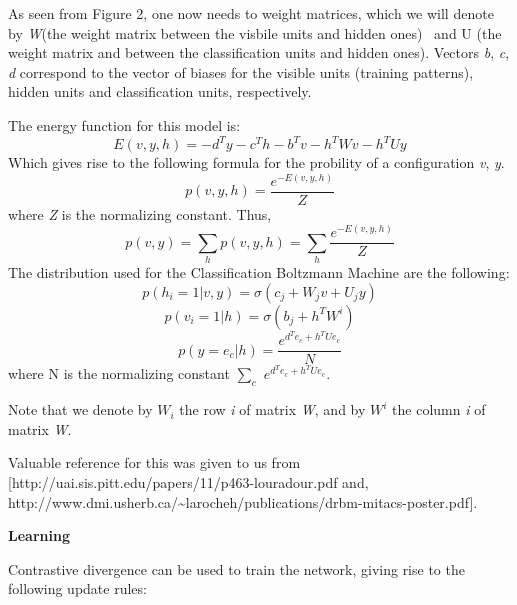 \documentclass{letter}
\newcommand{\nocomma}{}
\newcommand{\noplus}{}
\newcommand{\tmtextbf}[1]{{\bfseries{#1}}}
\newcommand{\tmtextit}[1]{{\itshape{#1}}}
\begin{document}
As seen from Figure 2, one now needs to weight matrices, which we will denote
by \tmtextit{W}(the weight matrix between the visbile units and hidden ones) \
and U (the weight matrix and between the classification units and hidden
ones). Vectors \tmtextit{b}, \tmtextit{c}, \tmtextit{d} correspond to the
vector of biases for the visible units (training patterns), hidden units and
classification units, respectively.

The energy function for this model is:
\[ E \left( v \nocomma, y, h \right) = - d^T y - c^T h - b^T v - h^T W v - h^T
   U y \]
Which gives rise to the following formula for the probility of a configuration
\tmtextit{v}, \tmtextit{y}.
\[ p \left( v, y, h \right) = \frac{e^{- E \left( v \nocomma, y, h
   \right)}}{Z} \]
where \tmtextit{Z} is the normalizing constant. Thus,
\[ p \left( v, y \right) = \sum_h p \left( v, y, h \right) = \sum_h \frac{e^{-
   E \left( v \nocomma, y, h \right)}}{Z} \]
The distribution used for the Classification Boltzmann Machine are the
following:
\begin{equation}
  p \left( h_i = 1 \left| v, y \right. \right) = \sigma \left( c_j + \noplus
  \noplus W_j v \noplus + U_j y \right)
\end{equation}
\begin{equation}
  p \left( v_i = 1 \left| h \right. \right) = \sigma \left( b_j + \noplus
  \noplus h^T W^i  \right)
\end{equation}
\begin{equation}
  p \left( y = e_c \left| h \right. \right) = \frac{e^{d^T e_c \noplus + h^T
  Ue_c}}{N}
\end{equation}
where N is the normalizing constant $\sum_c$ $e^{d^T e_c \noplus + h^T Ue_c}$.

Note that we denote by $W_i$ the row \tmtextit{i} of matrix \tmtextit{W}, and
by $W^i_{}$ the column \tmtextit{i} of matrix \tmtextit{W}.



Valuable reference for this was given to us from
[http://uai.sis.pitt.edu/papers/11/p463-louradour.pdf and,
http://www.dmi.usherb.ca/\~{ }larocheh/publications/drbm-mitacs-poster.pdf].

\tmtextbf{Learning}

Contrastive divergence can be used to train the network, giving rise to the
following update rules:
\end{document}

